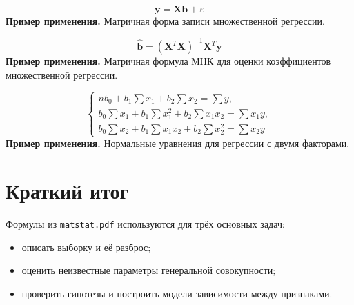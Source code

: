 \documentclass[a4paper,14pt]{extarticle}
\newcommand{\FormulaNote}[2]{%
  \begin{equation*}
  #1
  \end{equation*}
  \noindent\textbf{Пример применения.} #2\par\medskip
}
\begin{document}
\FormulaNote{\mathbf{y}=\mathbf{X}\mathbf{b}+\varepsilon}{Матричная форма записи множественной регрессии.}

\FormulaNote{\hat{\mathbf{b}}=(\mathbf{X}^T\mathbf{X})^{-1}\mathbf{X}^T\mathbf{y}}{Матричная формула МНК для оценки коэффициентов множественной регрессии.}

\FormulaNote{
\begin{cases}
nb_0+b_1\sum x_1+b_2\sum x_2=\sum y,\\
b_0\sum x_1+b_1\sum x_1^2+b_2\sum x_1x_2=\sum x_1y,\\
b_0\sum x_2+b_1\sum x_1x_2+b_2\sum x_2^2=\sum x_2y
\end{cases}
}{Нормальные уравнения для регрессии с двумя факторами.}

\section*{Краткий итог}

Формулы из \texttt{matstat.pdf} используются для трёх основных задач:
\begin{itemize}
  \item описать выборку и её разброс;
  \item оценить неизвестные параметры генеральной совокупности;
  \item проверить гипотезы и построить модели зависимости между признаками.
\end{itemize}
\end{document}
